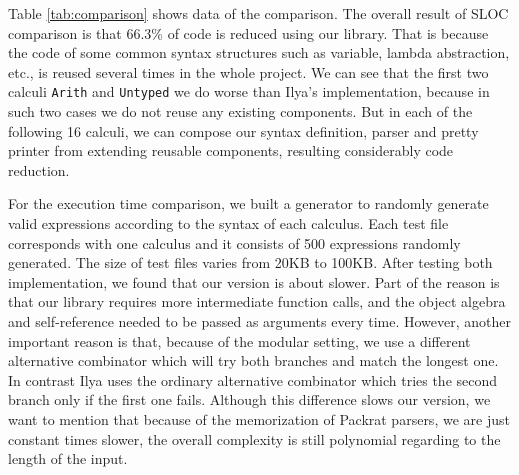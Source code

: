 Table \ref{tab:comparison} shows data of the comparison. The overall result of SLOC comparison is that 66.3\% of code is reduced using our library. That is because the code of some common syntax structures such as variable, lambda abstraction, etc., is reused several times in the whole project. We can see that the first two calculi \lstinline{Arith} and \lstinline{Untyped} we do worse than Ilya's implementation, because in such two cases we do not reuse any existing components. But in each of the following 16 calculi, we can compose our syntax definition, parser and pretty printer from extending reusable components, resulting considerably code reduction.

For the execution time comparison, we built a generator to randomly generate valid expressions according to the syntax of each calculus. Each test file corresponds with one calculus and it consists of 500 expressions randomly generated. The size of test files varies from 20KB to 100KB. After testing both implementation, we found that our version is about  slower. Part of the reason is that our library requires more intermediate function calls, and the object algebra and self-reference needed to be passed as arguments every time. However, another important reason is that, because of the modular setting, we use a different alternative combinator which will try both branches and match the longest one.  In contrast Ilya uses the ordinary alternative combinator which tries the second branch only if the first one fails. Although this difference slows our version, we want to mention that because of the memorization of Packrat parsers, we are just constant times slower, the overall complexity is still polynomial regarding to the length of the input.


